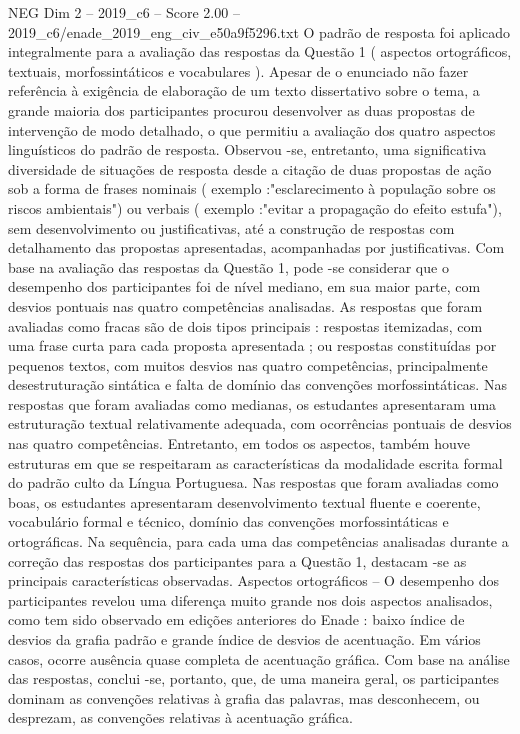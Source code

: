 \begin{textsample}{NEG Dim 2 – 2019\_c6 – Score 2.00 – 2019\_c6/enade\_2019\_eng\_civ\_e50a9f5296.txt}
O padrão de resposta foi aplicado integralmente para a avaliação das respostas da Questão 1 ( aspectos ortográficos, textuais, morfossintáticos e vocabulares ).
Apesar de o enunciado não fazer referência à exigência de elaboração de um texto dissertativo sobre o tema, a grande maioria dos participantes procurou desenvolver as duas propostas de intervenção de modo detalhado, o que permitiu a avaliação dos quatro aspectos linguísticos do padrão de resposta.
Observou -se, entretanto, uma significativa diversidade de situações de resposta desde a citação de duas propostas de ação sob a forma de frases nominais ( exemplo :"esclarecimento à população sobre os riscos ambientais") ou verbais ( exemplo :"evitar a propagação do efeito estufa"), sem desenvolvimento ou justificativas, até a construção de respostas com detalhamento das propostas apresentadas, acompanhadas por justificativas.
Com base na avaliação das respostas da Questão 1, pode -se considerar que o desempenho dos participantes foi de nível mediano, em sua maior parte, com desvios pontuais nas quatro competências analisadas.
As respostas que foram avaliadas como fracas são de dois tipos principais : respostas itemizadas, com uma frase curta para cada proposta apresentada ; ou respostas constituídas por pequenos textos, com muitos desvios nas quatro competências, principalmente desestruturação sintática e falta de domínio das convenções morfossintáticas.
Nas respostas que foram avaliadas como medianas, os estudantes apresentaram uma estruturação textual relativamente adequada, com ocorrências pontuais de desvios nas quatro competências.
Entretanto, em todos os aspectos, também houve estruturas em que se respeitaram as características da modalidade escrita formal do padrão culto da Língua Portuguesa.
Nas respostas que foram avaliadas como boas, os estudantes apresentaram desenvolvimento textual fluente e coerente, vocabulário formal e técnico, domínio das convenções morfossintáticas e ortográficas.
Na sequência, para cada uma das competências analisadas durante a correção das respostas dos participantes para a Questão 1, destacam -se as principais características observadas.
Aspectos ortográficos – O desempenho dos participantes revelou uma diferença muito grande nos dois aspectos analisados, como tem sido observado em edições anteriores do Enade : baixo índice de desvios da grafia padrão e grande índice de desvios de acentuação.
Em vários casos, ocorre ausência quase completa de acentuação gráfica.
Com base na análise das respostas, conclui -se, portanto, que, de uma maneira geral, os participantes dominam as convenções relativas à grafia das palavras, mas desconhecem, ou desprezam, as convenções relativas à acentuação gráfica.

\end{textsample}
